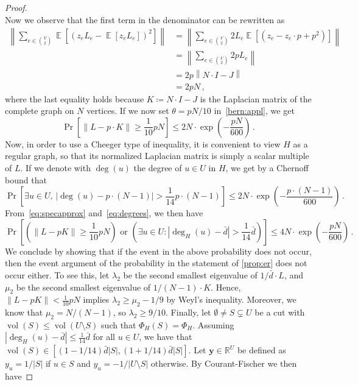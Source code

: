 \documentclass[epsfig,letter,11pt]{article}
\numberwithin{equation}{section}
\DeclareMathOperator{\ex}{\mathbb{E}}
\DeclareMathOperator{\vol}{vol}
\newcommand\vt[1]{\mathbf{#1}}
\newcommand{\nm}[1]{\left\|#1\right\|}
\begin{document}
\begin{proof}
\begin{equation}
	\end{equation}
	Now we observe that the first term in the denominator can be rewritten as
	\begin{align*}
		\nm{ \sum_{e \in \binom{V}{2}} \ex\left[(z_e L_e - \ex[z_eL_e])^2\right]} & = \nm{ \sum_{e \in \binom{V}{2}} 2L_e\ex\left[(z_e-z_e\cdot p+p^2)\right]} \\
		& = \nm{ \sum_{e \in \binom{V}{2}} 2pL_e} \\
		& = 2p \nm{N \cdot I-J} \\
		& = 2pN	\, ,
	\end{align*}
	where the last equality holds because $K \coloneqq N \cdot I-J$ is the Laplacian matrix of the complete graph on $N$ vertices. If we now set $\theta = pN/10$ in~\eqref{bern:appl}, we get
	\begin{equation}
		\label{eq:specapprox}
		\Pr\left[\nm{L-p \cdot K} \ge \frac{1}{10}pN\right] \le  2N \cdot \exp\left(-\frac{pN}{600}\right) \, .
	\end{equation}
	Now, in order to use a Cheeger type of inequality, it is convenient to view $H$ as a regular graph, so that its normalized Laplacian matrix is simply a scalar multiple of $L$. If we denote with $\deg(u)$ the degree of $u \in U$ in $H$, we get by a Chernoff bound that
	\begin{equation}
		\label{eq:degrees}
		\Pr\left[\text{$\exists u \in U$, } \left|\deg(u) - p\cdot (N-1)\right| > \frac{1}{14}p \cdot (N-1)\right] \le 2N \cdot \exp\left(-\frac{p\cdot (N-1)}{600}\right) \,.
	\end{equation}
	From~\eqref{eq:specapprox} and~\eqref{eq:degrees}, we then have
	\begin{equation}
		\label{eq:sectolast}
			\Pr\left[\left(\nm{L-p K} \ge \frac{1}{10}pN\right)\text{ or } \left(\exists u \in U : \left|\deg_H(u)-\bar{d}\right|>\frac{1}{14} \bar{d}\right)\right] \le 4N \cdot \exp\left(-\frac{pN}{600}\right) \, .
	\end{equation}
	We conclude by showing that if the event in the above probability does not occur, then the event argument of the probability in the statement of \cref{prop:er} does not occur either. To see this, let $\lambda_2$ be the second smallest eigenvalue of $1/\bar{d}  \cdot L$, and $\mu_2$ be the second smallest eigenvalue of $1/(N-1) \cdot K$. Hence, $\nm{L-p K} < \frac{1}{10}pN$ implies $\lambda_2 \ge \mu_2-1/9$ by Weyl's inequality. Moreover, we know that $\mu_2 = N/(N-1)$, so $\lambda_2 \ge 9/10$. Finally, let $\emptyset \neq S \subsetneq U$ be a cut with $\vol(S) \le \vol(U\setminus S)$ such that $\Phi_H(S) = \Phi_H$. Assuming $\left|\deg_H(u)-\bar{d}\right|\le \frac{1}{14} \bar{d}$ for all $u \in U$, we have that $\vol(S) \in [(1-1/14)\bar{d} |S|, (1+1/14)\bar{d} |S|]$. Let $\vt{y} \in \mathbb{R}^U$ be defined as $y_u = 1/|S|$ if $u \in S$ and $y_u=-1/|U \setminus S|$ otherwise. By Courant-Fischer we then have

\end{proof}
\end{document}
